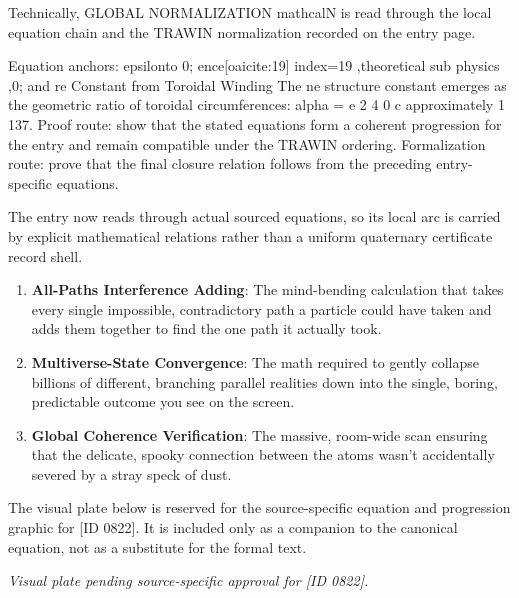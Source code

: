 Technically, GLOBAL NORMALIZATION mathcalN is read through the local equation chain and the TRAWIN normalization recorded on the entry page.

Equation anchors: epsilonto 0; ence[oaicite:19] index=19 ,theoretical sub physics ,0; and re Constant from Toroidal Winding The ne structure constant emerges as the geometric ratio of toroidal circumferences: alpha = e 2 4  0 c approximately 1 137. Proof route: show that the stated equations form a coherent progression for the entry and remain compatible under the TRAWIN ordering. Formalization route: prove that the final closure relation follows from the preceding entry-specific equations.

The entry now reads through actual sourced equations, so its local arc is carried by explicit mathematical relations rather than a uniform quaternary certificate record shell.
\endgroup

\begin{enumerate}[leftmargin=1.6em,itemsep=6pt,topsep=4pt]
\item \textbf{All-Paths Interference Adding}: The mind-bending calculation that takes every single impossible, contradictory path a particle could have taken and adds them together to find the one path it actually took.
\item \textbf{Multiverse-State Convergence}: The math required to gently collapse billions of different, branching parallel realities down into the single, boring, predictable outcome you see on the screen.
\item \textbf{Global Coherence Verification}: The massive, room-wide scan ensuring that the delicate, spooky connection between the atoms wasn't accidentally severed by a stray speck of dust.
\end{enumerate}

\begingroup\footnotesize\sloppy
The visual plate below is reserved for the source-specific equation and progression graphic for [ID 0822]. It is included only as a companion to the canonical equation, not as a substitute for the formal text.
\par\endgroup
\begingroup\footnotesize\itshape
Visual plate pending source-specific approval for [ID 0822].
\par\endgroup

